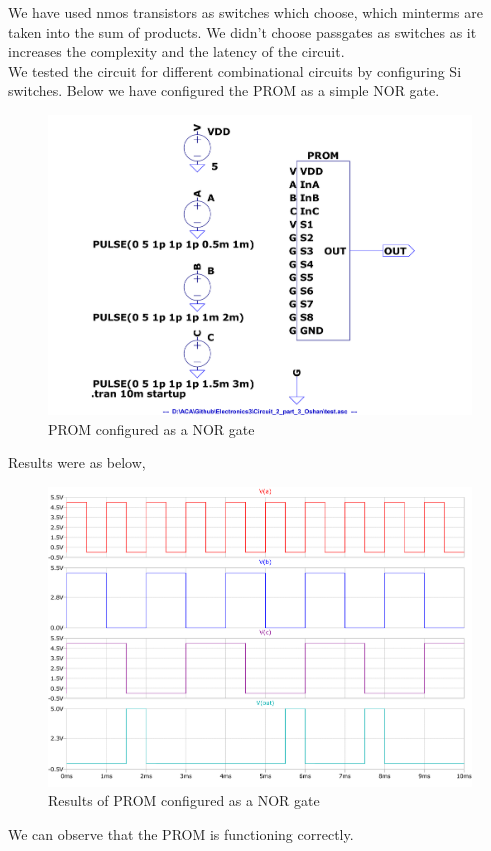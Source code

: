 \documentclass[a4paper,11pt]{article}%
\begin{document}
We have used nmos transistors as switches which choose, which minterms are taken into the sum of products. We didn’t choose passgates as switches as it increases the complexity and the latency of the circuit.\\ 

We tested the circuit for different combinational circuits by configuring Si switches. Below we have configured the PROM as a simple NOR gate.\\


\begin{figure}[H]
	\centering
	\includegraphics[scale=0.5]{figures/Figure335.pdf}
	\caption{PROM configured as a NOR gate}
\end{figure}

Results were as below,
\begin{figure}[H]
	\centering
	\includegraphics[scale=0.5]{figures/Figure336.pdf}
	\caption{Results of PROM configured as a NOR gate}
\end{figure}

We can observe that the PROM is functioning correctly.

%
%

\end{document}
